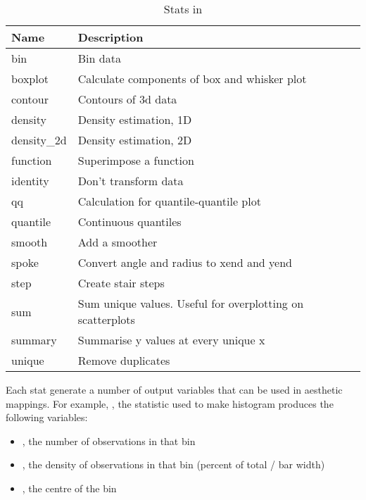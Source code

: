 \begin{table}
  \begin{center}
  \begin{tabular}{lp{3in}}
    \toprule
    Name & Description \\
    \midrule
    bin          & Bin data                                                   \\
    boxplot      & Calculate components of box and whisker plot               \\
    contour      & Contours of 3d data                                        \\
    density      & Density estimation, 1D                                     \\
    density\_2d & Density estimation, 2D                                     \\
    function     & Superimpose a function                                     \\
    identity     & Don't transform data                                       \\
    qq           & Calculation for quantile-quantile plot                     \\
    quantile     & Continuous quantiles                                       \\
    smooth       & Add a smoother                                             \\
    spoke        & Convert angle and radius to xend and yend                  \\
    step         & Create stair steps                                         \\
    sum          & Sum unique values.  Useful for overplotting on scatterplots\\
    summary      & Summarise y values at every unique x                       \\
    unique       & Remove duplicates                                          \\
    \bottomrule
  \end{tabular}
  \end{center}
  \caption{Stats in \ggplot}
  \label{tbl:stats}
\end{table}

Each stat generate a number of output variables that can be used in aesthetic mappings.  For example, , the statistic used to make histogram produces the following variables:

\begin{itemize}
  \item {}, the number of observations in that bin
  \item {}, the density of observations in that bin (percent of total /  bar width)
  \item {}, the centre of the bin
\end{itemize}

